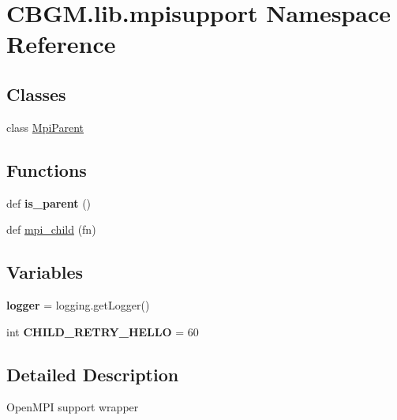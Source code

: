 \hypertarget{namespaceCBGM_1_1lib_1_1mpisupport}{}\section{C\+B\+G\+M.\+lib.\+mpisupport Namespace Reference}
\label{namespaceCBGM_1_1lib_1_1mpisupport}
\subsection*{Classes}
\begin{DoxyCompactItemize}
\item 
class \hyperlink{classCBGM_1_1lib_1_1mpisupport_1_1MpiParent}{Mpi\+Parent}
\end{DoxyCompactItemize}
\subsection*{Functions}
\begin{DoxyCompactItemize}
\item 
\mbox{\label{namespaceCBGM_1_1lib_1_1mpisupport_a5fe58498f00e2f01927f1c49327376af}} 
def {\bfseries is\+\_\+parent} ()
\item 
def \hyperlink{namespaceCBGM_1_1lib_1_1mpisupport_a83d73a92ab76c25d2d0449d475f5f2ab}{mpi\+\_\+child} (fn)
\end{DoxyCompactItemize}
\subsection*{Variables}
\begin{DoxyCompactItemize}
\item 
\mbox{\label{namespaceCBGM_1_1lib_1_1mpisupport_a14a8d159280e7dc4b01e43273072edf4}} 
{\bfseries logger} = logging.\+get\+Logger()
\item 
\mbox{\label{namespaceCBGM_1_1lib_1_1mpisupport_a1464ce45bad40e88e937ab566d33ef4c}} 
int {\bfseries C\+H\+I\+L\+D\+\_\+\+R\+E\+T\+R\+Y\+\_\+\+H\+E\+L\+LO} = 60
\end{DoxyCompactItemize}


\subsection{Detailed Description}
\begin{DoxyVerb}OpenMPI support wrapper
\end{DoxyVerb}
 

